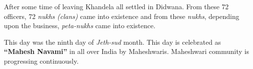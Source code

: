 After some time of leaving Khandela all settled in Didwana. From these 72 officers, 72 \textit{nukhs (clans)} came into existence and from these \textit{nukhs}, depending upon the business, \textit{peta-nukhs} came into existence.

This day was the ninth day of \textit{Jeth-sud} month. This day is celebrated as \textbf{``Mahesh Navami''} in all over India by Maheshwaris. Maheshwari community is progressing continuously.
